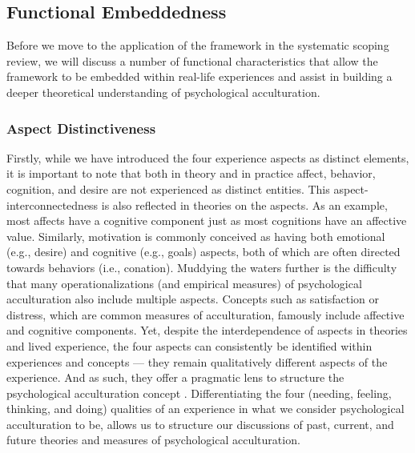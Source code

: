 \documentclass[man, 12pt, a4paper, mask]{apa7}
\begin{document}
\subsection{Functional Embeddedness}
Before we move to the application of the framework in the systematic scoping review, we will discuss a number of functional characteristics that allow the framework to be embedded within real-life experiences and assist in building a deeper theoretical understanding of psychological acculturation.

\subsubsection{Aspect Distinctiveness}
Firstly, while we have introduced the four experience aspects as distinct elements, it is important to note that both in theory and in practice affect, behavior, cognition, and desire are not experienced as distinct entities. This aspect-interconnectedness is also reflected in theories on the aspects. As an example, most affects have a cognitive component just as most cognitions have an affective value. Similarly, motivation is commonly conceived as having both emotional (e.g., desire) and cognitive (e.g., goals) aspects, both of which are often directed towards behaviors (i.e., conation). Muddying the waters further is the difficulty that many operationalizations (and empirical measures) of psychological acculturation also include multiple aspects. Concepts such as satisfaction or distress, which are common measures of acculturation, famously include affective and cognitive components. Yet, despite the interdependence of aspects in theories and lived experience, the four aspects can consistently be identified within experiences and concepts --- they remain qualitatively different aspects of the experience. And as such, they offer a pragmatic lens to structure the psychological acculturation concept \citep{Kuhn1962}. Differentiating the four (needing, feeling, thinking, and doing) qualities of an experience in what we consider psychological acculturation to be, allows us to structure our discussions of past, current, and future theories and measures of psychological acculturation.
\end{document}
